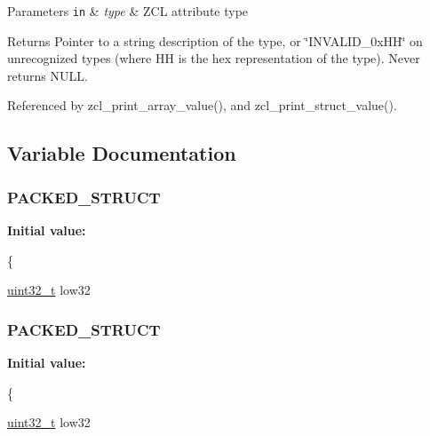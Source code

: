 \begin{DoxyParams}[1]{Parameters}
\mbox{\tt in}  & {\em type} & Z\-C\-L attribute type\\
\hline
\end{DoxyParams}
\begin{DoxyReturn}{Returns}
Pointer to a string description of the type, or \char`\"{}\-I\-N\-V\-A\-L\-I\-D\-\_\-0x\-H\-H\char`\"{} on unrecognized types (where H\-H is the hex representation of the type). Never returns N\-U\-L\-L. 
\end{DoxyReturn}


Referenced by zcl\-\_\-print\-\_\-array\-\_\-value(), and zcl\-\_\-print\-\_\-struct\-\_\-value().



\subsection{Variable Documentation}
\hypertarget{group__zcl__types_ga5d86508e715769ce35a4845ed5f8f252}{
\subsubsection[{P\-A\-C\-K\-E\-D\-\_\-\-S\-T\-R\-U\-C\-T}]{\setlength{\rightskip}{0pt plus 5cm}P\-A\-C\-K\-E\-D\-\_\-\-S\-T\-R\-U\-C\-T}}\label{group__zcl__types_ga5d86508e715769ce35a4845ed5f8f252}
{\bfseries Initial value\-:}
\begin{DoxyCode}
\{

         \hyperlink{group__hal__dos_ga09a1e304d66d35dd47daffee9731edaa}{uint32\_t}  low32
\end{DoxyCode}
\hypertarget{group__zcl__types_ga5d86508e715769ce35a4845ed5f8f252}{
\subsubsection[{P\-A\-C\-K\-E\-D\-\_\-\-S\-T\-R\-U\-C\-T}]{\setlength{\rightskip}{0pt plus 5cm}P\-A\-C\-K\-E\-D\-\_\-\-S\-T\-R\-U\-C\-T}}\label{group__zcl__types_ga5d86508e715769ce35a4845ed5f8f252}
{\bfseries Initial value\-:}
\begin{DoxyCode}
\{

         \hyperlink{group__hal__dos_ga09a1e304d66d35dd47daffee9731edaa}{uint32\_t}  low32
\end{DoxyCode}
